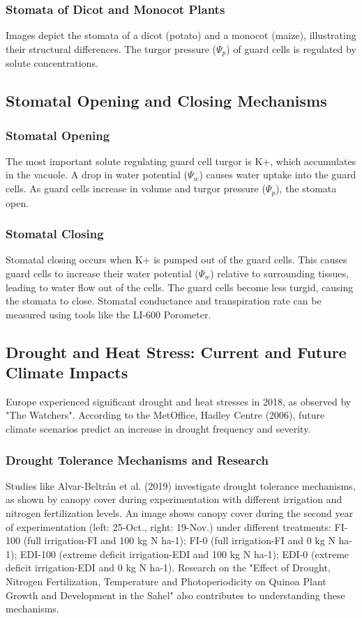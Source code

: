 \subsubsection{Stomata of Dicot and Monocot Plants} 
Images depict the stomata of a dicot (potato) and a monocot (maize), illustrating their structural differences. The turgor pressure ($\Psi_p$) of guard cells is regulated by solute concentrations.

\subsection{Stomatal Opening and Closing Mechanisms} 
\subsubsection{Stomatal Opening} 
The most important solute regulating guard cell turgor is K+, which accumulates in the vacuole. A drop in water potential ($\Psi_w$) causes water uptake into the guard cells. As guard cells increase in volume and turgor pressure ($\Psi_p$), the stomata open.

\subsubsection{Stomatal Closing} 
Stomatal closing occurs when K+ is pumped out of the guard cells. This causes guard cells to increase their water potential ($\Psi_w$) relative to surrounding tissues, leading to water flow out of the cells. The guard cells become less turgid, causing the stomata to close.
Stomatal conductance and transpiration rate can be measured using tools like the LI-600 Porometer.

\subsection{Drought and Heat Stress: Current and Future Climate Impacts} 
Europe experienced significant drought and heat stresses in 2018, as observed by "The Watchers". According to the MetOffice, Hadley Centre (2006), future climate scenarios predict an increase in drought frequency and severity.

\subsubsection{Drought Tolerance Mechanisms and Research} 
Studies like Alvar-Beltrán et al. (2019) investigate drought tolerance mechanisms, as shown by canopy cover during experimentation with different irrigation and nitrogen fertilization levels. An image shows canopy cover during the second year of experimentation (left: 25-Oct., right: 19-Nov.) under different treatments: FI-100 (full irrigation-FI and 100 kg N ha-1); FI-0 (full irrigation-FI and 0 kg N ha-1); EDI-100 (extreme deficit irrigation-EDI and 100 kg N ha-1); EDI-0 (extreme deficit irrigation-EDI and 0 kg N ha-1). Research on the "Effect of Drought, Nitrogen Fertilization, Temperature and Photoperiodicity on Quinoa Plant Growth and Development in the Sahel" also contributes to understanding these mechanisms.

